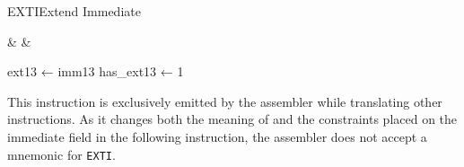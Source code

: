 \begin{instruction}{EXTI}{Extend Immediate}
  \begin{encoding}
    \mnemonic &  &  \\
  \end{encoding}
\begin{operation}
ext13 ← imm13
has_ext13 ← 1
\end{operation}
  \begin{remarks}This instruction is exclusively emitted by the assembler while translating other instructions. As it changes both the meaning of and the constraints placed on the immediate field in the following instruction, the assembler does not accept a mnemonic for \texttt{EXTI}.\end{remarks}
\end{instruction}

